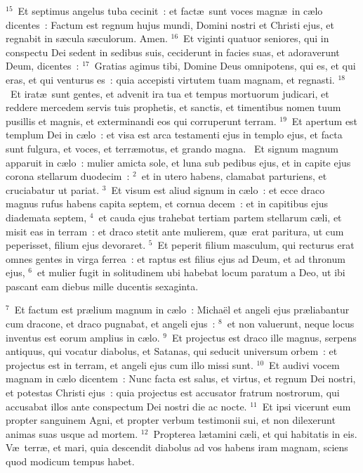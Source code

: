 ${}^{15}$~Et septimus angelus tuba cecinit~: et fact\ae\ sunt voces magn\ae\ in c\ae lo dicentes~: Factum est regnum hujus mundi, Domini nostri et Christi ejus, et regnabit in s\ae cula s\ae culorum. Amen.
${}^{16}$~Et viginti quatuor seniores, qui in conspectu Dei sedent in sedibus suis, ceciderunt in facies suas, et adoraverunt Deum, dicentes~:
${}^{17}$~Gratias agimus tibi, Domine Deus omnipotens, qui es, et qui eras, et qui venturus es~: quia accepisti virtutem tuam magnam, et regnasti.
${}^{18}$~Et irat\ae\ sunt gentes, et advenit ira tua et tempus mortuorum judicari, et reddere mercedem servis tuis prophetis, et sanctis, et timentibus nomen tuum pusillis et magnis, et exterminandi eos qui corruperunt terram.
${}^{19}$~Et apertum est templum Dei in c\ae lo~: et visa est arca testamenti ejus in templo ejus, et facta sunt fulgura, et voces, et terr\ae motus, et grando magna.
~\lettrine[lines=10,image=true,loversize=0.05,lraise=-0.03]{E}{}t signum magnum apparuit in c\ae lo~: mulier amicta sole, et luna sub pedibus ejus, et in capite ejus corona stellarum duodecim~:
${}^{2}$~et in utero habens, clamabat parturiens, et cruciabatur ut pariat.
${}^{3}$~Et visum est aliud signum in c\ae lo~: et ecce draco magnus rufus habens capita septem, et cornua decem~: et in capitibus ejus diademata septem,
${}^{4}$~et cauda ejus trahebat tertiam partem stellarum c\ae li, et misit eas in terram~: et draco stetit ante mulierem, qu\ae\ erat paritura, ut cum peperisset, filium ejus devoraret.
${}^{5}$~Et peperit filium masculum, qui recturus erat omnes gentes in virga ferrea~: et raptus est filius ejus ad Deum, et ad thronum ejus,
${}^{6}$~et mulier fugit in solitudinem ubi habebat locum paratum a Deo, ut ibi pascant eam diebus mille ducentis sexaginta.


${}^{7}$~Et factum est pr\ae lium magnum in c\ae lo~: Micha\"el et angeli ejus pr\ae liabantur cum dracone, et draco pugnabat, et angeli ejus~:
${}^{8}$~et non valuerunt, neque locus inventus est eorum amplius in c\ae lo.
${}^{9}$~Et projectus est draco ille magnus, serpens antiquus, qui vocatur diabolus, et Satanas, qui seducit universum orbem~: et projectus est in terram, et angeli ejus cum illo missi sunt.
${}^{10}$~Et audivi vocem magnam in c\ae lo dicentem~: Nunc facta est salus, et virtus, et regnum Dei nostri, et potestas Christi ejus~: quia projectus est accusator fratrum nostrorum, qui accusabat illos ante conspectum Dei nostri die ac nocte.
${}^{11}$~Et ipsi vicerunt eum propter sanguinem Agni, et propter verbum testimonii sui, et non dilexerunt animas suas usque ad mortem.
${}^{12}$~Propterea l\ae tamini c\ae li, et qui habitatis in eis. V\ae\ terr\ae , et mari, quia descendit diabolus ad vos habens iram magnam, sciens quod modicum tempus habet.



